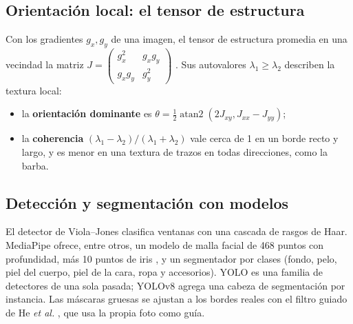 \subsection{Orientación local: el tensor de estructura}

Con los gradientes $g_x,g_y$ de una imagen, el tensor de estructura promedia en una vecindad la matriz $J=\begin{pmatrix}g_x^2 & g_xg_y\\ g_xg_y & g_y^2\end{pmatrix}$ \cite{bigun1987}. Sus autovalores $\lambda_1\ge\lambda_2$ describen la textura local:
\begin{itemize}
  \item la \textbf{orientación dominante} es $\theta=\tfrac12\operatorname{atan2}(2J_{xy},J_{xx}-J_{yy})$;
  \item la \textbf{coherencia} $(\lambda_1-\lambda_2)/(\lambda_1+\lambda_2)$ vale cerca de 1 en un borde recto y largo, y es menor en una textura de trazos en todas direcciones, como la barba.
\end{itemize}

\subsection{Detección y segmentación con modelos}

El detector de Viola--Jones \cite{viola2001} clasifica ventanas con una cascada de rasgos de Haar. MediaPipe \cite{lugaresi2019} ofrece, entre otros, un modelo de malla facial de 468 puntos con profundidad, más 10 puntos de iris \cite{kartynnik2019}, y un segmentador por clases (fondo, pelo, piel del cuerpo, piel de la cara, ropa y accesorios). YOLO \cite{redmon2016} es una familia de detectores de una sola pasada; YOLOv8 \cite{jocher2023} agrega una cabeza de segmentación por instancia. Las máscaras gruesas se ajustan a los bordes reales con el filtro guiado de He \emph{et al.} \cite{he2013}, que usa la propia foto como guía.
